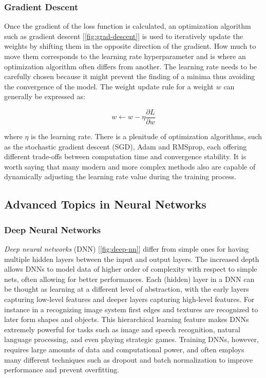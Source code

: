 \documentclass[../Thesis.tex]{subfiles}
\begin{document}
	
	
	\subsubsection{Gradient Descent}
		
	Once the gradient of the loss function is calculated, an optimization algorithm such as gradient descent [\autoref{fig:grad-descent}] is used to iteratively update the weights by shifting them in the opposite direction of the gradient. How much to move them corresponds to the learning rate hyperparameter and is where an optimization algorithm often differs from another. The learning rate needs to be carefully chosen because it might prevent the finding of a minima thus avoiding the convergence of the model. The weight update rule for a weight \(w\) can generally be expressed as:
	
	\[
	w \leftarrow w - \eta \frac{\partial L}{\partial w}
	\]
	
	where \(\eta\) is the learning rate. There is a plenitude of optimization algorithms, such as the stochastic gradient descent (SGD), Adam and RMSprop, each offering different trade-offs between computation time and convergence stability. It is worth saying that many modern and more complex methods also are capable of dynamically adjusting the learning rate value during the training process.
	
	
	
	\subsection{Advanced Topics in Neural Networks}
	
	\subsubsection{Deep Neural Networks}
	\emph{Deep neural networks} (DNN) [\autoref{fig:deep-nn}] differ from simple ones for having multiple hidden layers between the input and output layers. The increased depth allows DNNs to model data of higher order of complexity with respect to simple nets, often allowing for better performances. Each (hidden) layer in a DNN can be thought as learning at a different level of abstraction, with the early layers capturing low-level features and deeper layers capturing high-level features. For instance in a recognizing image system first edges and textures are recognized to later form shapes and objects. This hierarchical learning feature makes DNNs extremely powerful for tasks such as image and speech recognition, natural language processing, and even playing strategic games. Training DNNs, however, requires large amounts of data and computational power, and often employs many different techniques such as dropout and batch normalization to improve performance and prevent overfitting.
	
\end{document}
